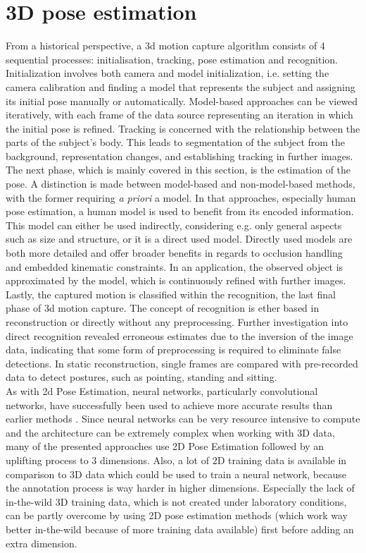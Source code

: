 \section{3D pose estimation}
From a historical perspective, a 3d motion capture algorithm consists of 4 sequential processes: initialisation, tracking, pose estimation and recognition. Initialization involves both camera and model initialization, i.e. setting the camera calibration and finding a model that represents the subject and assigning its initial pose manually or automatically. Model-based approaches can be viewed iteratively, with each frame of the data source representing an iteration in which the initial pose is refined. Tracking is concerned with the relationship between the parts of the subject's body. This leads to segmentation of the subject from the background, representation changes, and establishing tracking in further images. The next phase, which is mainly covered in this section, is the estimation of the pose. A distinction is made between model-based and non-model-based methods, with the former requiring  \emph{a priori} a model. In that approaches, especially human pose estimation, a human model is used to benefit from its encoded information. This model can either be used indirectly, considering e.g. only general aspects such as size and structure, or it is a direct used model. Directly used models are both more detailed and offer broader benefits in regards to occlusion handling and embedded kinematic constraints. In an application, the observed object is approximated by the model, which is continuously refined with further images. Lastly, the captured motion is classified within the recognition, the last final phase of 3d motion capture. The concept of recognition is ether based in reconstruction or directly without any preprocessing. Further investigation \cite{sumi} into direct recognition revealed erroneous estimates due to the inversion of the image data, indicating that some form of preprocessing is required to eliminate false detections.  In static reconstruction, single frames are compared with pre-recorded data to detect postures, such as pointing, standing and sitting. \cite{summary80s}
\\
As with 2d Pose Estimation, neural networks, particularly convolutional networks, have successfully been used to achieve more accurate results than earlier methods \cite{wang_deep_2021, Chen2016, Chen_2017_CVPR, Tome_2017_CVPR, Andrikula2010, Ye2011, Martinez_2017_ICCV}. Since neural networks can be very resource intensive to compute and the architecture can be extremely complex when working with 3D data, many  of the presented approaches use 2D Pose Estimation followed by an uplifting process to 3 dimensions.  Also, a lot of 2D training data is available in comparison to 3D data which could be used to train a neural network, because the annotation process is way harder in higher dimensions. Especially the lack of in-the-wild 3D training data, which is not created under laboratory conditions, can be partly overcome by using 2D pose estimation methods (which work way better in-the-wild because of more training data available) first before adding an extra dimension.
